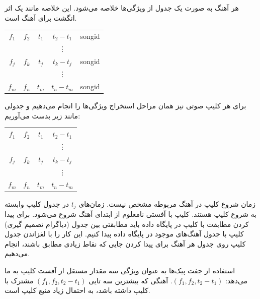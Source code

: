 \documentclass{utsignal}
\begin{document}
	هر آهنگ به صورت یک جدول از ویژگی‌ها خلاصه می‌شود. این خلاصه مانند یک اثر انگشت برای آهنگ است.
	\begin{center}
		\begin{latin}
			\begin{tabular}{|c|c|c|c|c|}
				$f_1$ & $f_2$ & $t_1$ & $t_2-t_1$ & songid\\
				&&&\vdots&\\
				$f_j$ & $f_k$ & $t_j$ & $t_k-t_j$ & songid\\
				&&&\vdots&\\
				$f_m$ & $f_n$ & $t_m$ & $t_n-t_m$ & songid\\
			\end{tabular}
		\end{latin}
	\end{center}
	برای هر کلیپ صوتی نیز همان مراحل استخراج ویژگی‌ها را انجام می‌دهیم و جدولی مانند زیر بدست می‌آوریم:
	\begin{center}
		\begin{latin}
			\begin{tabular}{|c|c|c|c|}
				$f_1$ & $f_2$ & $t_1$ & $t_2-t_1$\\
				&&&\vdots\\
				$f_j$ & $f_k$ & $t_j$ & $t_k-t_j$\\
				&&&\vdots\\
				$f_m$ & $f_n$ & $t_m$ & $t_n-t_m$\\
			\end{tabular}
		\end{latin}
	\end{center}
	
	زمان شروع کلیپ در آهنگ مربوطه مشخص نیست. زمان‌های $t_j$ در جدول کلیپ وابسته به شروع کلیپ هستند. کلیپ با آفستی نامعلوم از ابتدای آهنگ شروع می‌شود. برای پیدا کردن مطابقت با کلیپ در پایگاه داده باید مطابقتی بین جدول (دیاگرام تصمیم گیری) کلیپ با جدول آهنگ‌های موجود در پایگاه داده پیدا کنیم. این کار را با لغزاندن جدول کلیپ روی جدول هر آهنگ برای پیدا کردن جایی که نقاط زیادی مطابق باشند، انجام می‌دهیم.
	
	استفاده از جفت پیک‌ها به عنوان ویژگی سه مقدار مستقل از آفست کلیپ به ما می‌دهد: $(f_1, f_2, t_2-t_1)$. آهنگی که بیشترین سه تایی $(f_1, f_2, t_2 - t_1)$ مشترک با کلیپ داشته باشد، به احتمال زیاد منبع کلیپ است.
\end{document}
